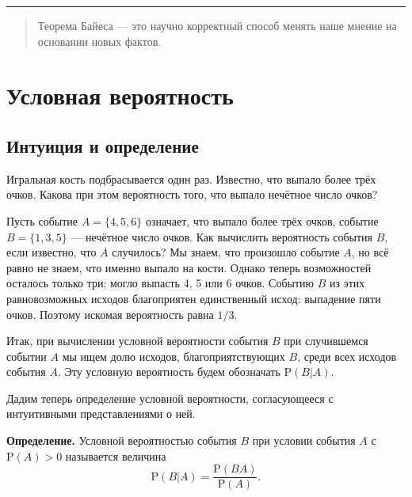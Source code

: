 \documentclass[11pt,a4paper]{article}
\begin{document}
    \begin{center}\rule{0.5\linewidth}{0.5pt}\end{center}

    \begin{quote}
Теорема Байеса --- это научно корректный способ менять наше мнение на
основании новых фактов.
\end{quote}

    \hypertarget{ux443ux441ux43bux43eux432ux43dux430ux44f-ux432ux435ux440ux43eux44fux442ux43dux43eux441ux442ux44c}{%
\section{Условная
вероятность}\label{ux443ux441ux43bux43eux432ux43dux430ux44f-ux432ux435ux440ux43eux44fux442ux43dux43eux441ux442ux44c}}

\hypertarget{ux438ux43dux442ux443ux438ux446ux438ux44f-ux438-ux43eux43fux440ux435ux434ux435ux43bux435ux43dux438ux435}{%
\subsection{Интуиция и
определение}\label{ux438ux43dux442ux443ux438ux446ux438ux44f-ux438-ux43eux43fux440ux435ux434ux435ux43bux435ux43dux438ux435}}

Игральная кость подбрасывается один раз. Известно, что выпало более трёх
очков. Какова при этом вероятность того, что выпало нечётное число
очков?

Пусть событие \(A = \{4, 5, 6\}\) означает, что выпало более трёх очков,
событие \(B = \{1, 3, 5\}\) --- нечётное число очков. Как вычислить
вероятность события \(B\), если известно, что \(A\) случилось? Мы знаем,
что произошло событие \(A\), но всё равно не знаем, что именно выпало на
кости. Однако теперь возможностей осталось только три: могло выпасть 4,
5 или 6 очков. Событию \(B\) из этих равновозможных исходов благоприятен
единственный исход: выпадение пяти очков. Поэтому искомая вероятность
равна \(1/3\).

Итак, при вычислении условной вероятности события \(B\) при случившемся
событии \(A\) мы ищем долю исходов, благоприятствующих \(B\), среди всех
исходов события \(A\). Эту условную вероятность будем обозначать
\(\mathrm{P}(B|A)\).

Дадим теперь определение условной вероятности, согласующееся с
интуитивными представлениями о ней.

\textbf{Определение.} Условной вероятностью события \(B\) при условии
события \(A\) с \(\mathrm{P}(A)>0\) называется величина
\[ \mathrm{P}(B|A) = \dfrac{\mathrm{P}(BA)}{\mathrm{P}(A)}. \]
\end{document}
